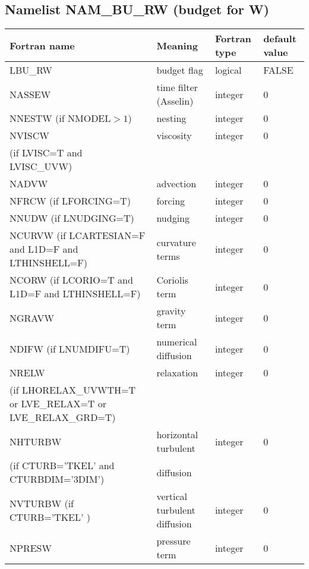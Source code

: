 \subsection{Namelist NAM\_BU\_RW (budget for W)}

\begin{longtable} {|p{}|p{}|>{\centering}p{}|p{}<{\centering}|}
\hline
Fortran name & Meaning & Fortran type & default value \\
\hline \hline
\endhead
LBU\_RW  & budget flag & logical & FALSE\index{LBU\_RW!\innam{NAM\_BU\_RW}} \\\hline
NASSEW   & time filter (Asselin)   & integer  &  0 \index{NASSEW!\innam{NAM\_BU\_RW}} \\\hline
NNESTW (if NMODEL$>1$) & nesting           & integer  &  0 \index{NNESTW!\innam{NAM\_BU\_RW}} \\\hline
NVISCW   & viscosity         & integer  &  0 \index{NVISCW!\innam{NAM\_BU\_RW}}\\
(if LVISC=T and LVISC\_UVW) &  &   &   \\\hline
NADVW   & advection & integer  &  0 \index{NADVW!\innam{NAM\_BU\_RW}}\\\hline
NFRCW (if LFORCING=T)   & forcing           & integer  &  0 \index{NFRCW!\innam{NAM\_BU\_RW}} \\\hline
NNUDW (if LNUDGING=T)   & nudging           & integer  &  0 \index{NNUDW!\innam{NAM\_BU\_RW}} \\\hline
NCURVW (if LCARTESIAN=F and L1D=F and LTHINSHELL=F) & curvature terms   & integer  &  0 \index{NCURVW!\innam{NAM\_BU\_RW}}\\\hline
NCORW (if LCORIO=T and L1D=F and LTHINSHELL=F) & Coriolis  term    & integer  &  0 \index{NCORW!\innam{NAM\_BU\_RW}}\\\hline
NGRAVW   & gravity  term     & integer  &  0 \index{NGRAVW!\innam{NAM\_BU\_RW}}\\\hline
NDIFW (if LNUMDIFU=T)   & numerical diffusion & integer  &  0 \index{NDIFW!\innam{NAM\_BU\_RW}}\\\hline
NRELW    & relaxation        & integer  &  0 \index{NRELW!\innam{NAM\_BU\_RW}}\\ \nopagebreak
(if LHORELAX\_UVWTH=T or LVE\_RELAX=T or LVE\_RELAX\_GRD=T) &  &   &   \\\hline
NHTURBW  & horizontal turbulent & integer  &  0 \index{NHTURBW!\innam{NAM\_BU\_RW}}\\ \nopagebreak
(if CTURB='TKEL' and CTURBDIM='3DIM') &diffusion &   &  \\\hline
NVTURBW (if CTURB='TKEL' )  & vertical turbulent diffusion & integer  &  0 \index{NVTURBW!\innam{NAM\_BU\_RW}}\\\hline
NPRESW   & pressure term       & integer  &  0 \index{NPRESW!\innam{NAM\_BU\_RW}}  \\\hline
\end{longtable}

